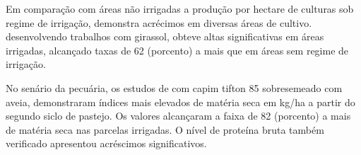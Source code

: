 Em comparação com áreas não irrigadas a produção por hectare de culturas sob regime de irrigação, demonstra acrécimos em diversas áreas de cultivo. \cite{sanches2013girassol} desenvolvendo trabalhos com girassol, obteve altas significativas em áreas irrigadas, alcançado taxas de 62 (porcento) a mais que em áreas sem regime de irrigação. 

No senário da pecuária, os estudos de \cite{sanches2013tiftom} com capim tifton 85   sobresemeado com aveia, demonstraram índices mais elevados de matéria seca em kg/ha a partir do segundo siclo de pastejo. Os valores alcançaram a faixa de 82 (porcento) a mais de matéria seca nas parcelas irrigadas. O nível de proteína bruta também verificado apresentou acréscimos significativos.
